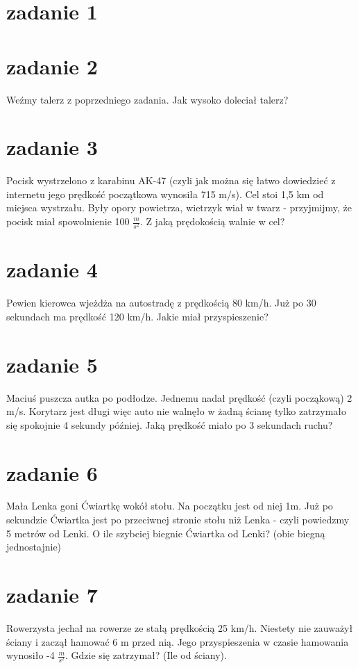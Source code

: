 \documentclass{article}
\begin{document}
\section{zadanie 1}
\section*{zadanie 2}
Weźmy talerz z poprzedniego zadania. Jak wysoko doleciał talerz?  
\section*{zadanie 3}
Pocisk wystrzelono z karabinu AK-47 (czyli jak można się łatwo dowiedzieć z internetu jego prędkość początkowa wynosiła 715 m/s). Cel stoi 1,5 km od miejsca wystrzału. Były opory powietrza, wietrzyk wiał w twarz - przyjmijmy, że pocisk miał spowolnienie 100 $\frac{m}{s^{2}}$. Z jaką prędokością walnie w cel?
\section*{zadanie 4}
Pewien kierowca wjeżdża na autostradę z prędkością 80 km/h. Już po 30 sekundach ma prędkość 120 km/h. Jakie miał przyspieszenie?

\section*{zadanie 5}
Maciuś puszcza autka po podłodze. Jednemu nadał prędkość (czyli począkową) 2 m/s. Korytarz jest długi więc auto nie walnęło w żadną ścianę tylko zatrzymało się spokojnie 4 sekundy później. Jaką prędkość miało po 3 sekundach ruchu?
\section*{zadanie 6}
Mała Lenka goni Ćwiartkę wokół stołu. Na początku jest od niej 1m. Już po sekundzie Ćwiartka jest po przeciwnej stronie stołu niż Lenka - czyli powiedzmy 5 metrów od Lenki. O ile szybciej biegnie Ćwiartka od Lenki? (obie biegną jednostajnie)
\section*{zadanie 7}
Rowerzysta jechał na rowerze ze stałą prędkością 25 km/h. Niestety nie zauważył ściany i zaczął hamować 6 m przed nią. Jego przyspieszenia w czasie hamowania wynosiło -4 $\frac{m}{s^{2}}$. Gdzie się zatrzymał? (Ile od ściany).
\end{document}
